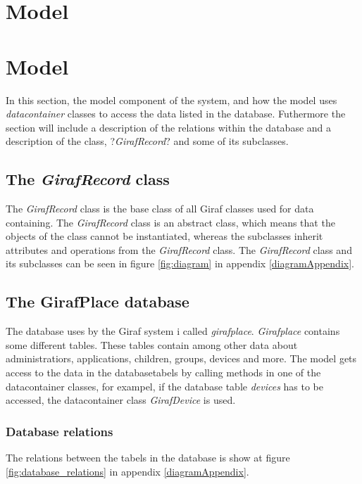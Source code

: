 \section{Model}
\label{model}

\section{Model}
In this section, the model component of the system, and how the model uses \textit{datacontainer} classes to access the data listed in the database. Futhermore the section will include a description of the relations within the database and a description of the class, ?\textit{GirafRecord}? and some of its subclasses.

\subsection{The \textit{GirafRecord} class}
The \textit{GirafRecord} class is the base class of all Giraf classes used for data containing. The \textit{GirafRecord} class is an abstract class, which means that the objects of the class cannot be instantiated, whereas the subclasses inherit attributes and operations from the \textit{GirafRecord} class. The \textit{GirafRecord} class and its subclasses can be seen in figure \ref{fig:diagram} in appendix \ref{diagramAppendix}.

\subsection{The GirafPlace database}
The database uses by the Giraf system i called \textit{girafplace}. \textit{Girafplace} contains some different tables. These tables contain among other data about administratiors, applications, children, groups, devices and more.
The model gets access to the data in the databasetabels by calling methods in one of the datacontainer classes, for exampel, if the database table \textit{devices} has to be accessed, the datacontainer class \textit{GirafDevice} is used.

\subsubsection{Database relations}
The relations between the tabels in the database is show at figure \ref{fig:database_relations} in appendix \ref{diagramAppendix}.
